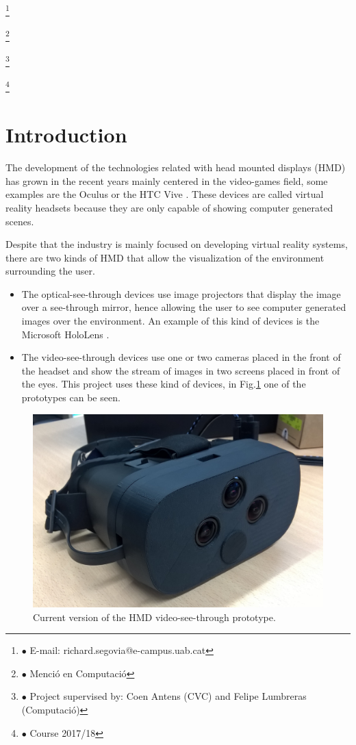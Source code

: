 \documentclass[10pt,a4paper,twocolumn,twoside]{article}
\newcommand\blfootnote[1]{%
  \begingroup
  \renewcommand\thefootnote{}\footnote{#1}%
  \addtocounter{footnote}{-1}%
  \endgroup
}
\begin{document}
	\blfootnote{$\bullet$ E-mail: richard.segovia@e-campus.uab.cat}
	\blfootnote{$\bullet$ Menció en Computació}
	\blfootnote{$\bullet$ Project supervised by: Coen Antens (CVC) and Felipe Lumbreras (Computació)}
	\blfootnote{$\bullet$ Course 2017/18}
	
	\section{Introduction}
	
	The development of the technologies related with head mounted displays (HMD) has grown in the recent years mainly centered in the video-games field, some examples are the Oculus \cite{web:oculus} or the HTC Vive \cite{web:vive}. These devices are called virtual reality headsets because they are only capable of showing computer generated scenes.  
	
	Despite that the industry is mainly focused on developing virtual reality systems, there are two kinds of HMD that allow the visualization of the environment surrounding the user.  

	\begin{itemize}
	\item The optical-see-through devices use image projectors that display the image over a see-through mirror, hence allowing the user to see computer generated images over the environment. An example of this kind of devices is the Microsoft HoloLens \cite{web:hololens}.
	\item The video-see-through devices use one or two cameras placed in the front of the headset and show the stream of images in two screens placed in front of the eyes. This project uses these kind of devices, in Fig.\ref{fig:proto} one of the prototypes can be seen. 
	\end{itemize}

	\begin{figure}
		\centering
		\includegraphics[width=1\linewidth]{img/imagenproto3.jpg}
		\caption{Current version of the HMD video-see-through prototype.}
		\label{fig:proto}
	\end{figure}
	
\end{document}

